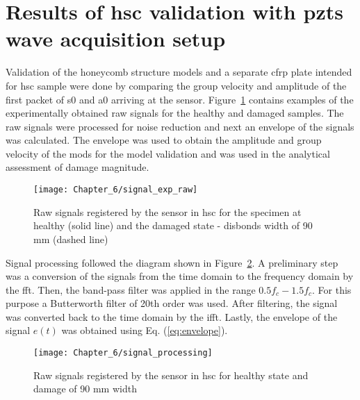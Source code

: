 \section{Results of \acl{hsc} validation with \aclp{pzt} wave acquisition setup}
\label{sec:resuls_pzt}
Validation of the honeycomb structure models and a separate \ac{cfrp} plate intended for \ac{hsc} sample were done by comparing the group velocity and amplitude of the first packet of \ac{s0} and \ac{a0} arriving at the sensor.
Figure~\ref{fig:signal_exp_raw} contains examples of the experimentally obtained raw signals for the healthy and damaged samples.
The raw signals were processed for noise reduction and next an envelope of the signals was calculated.
The envelope was used to obtain the amplitude and group velocity of the mods for the model validation and was used in the analytical assessment of damage magnitude.
\begin{figure}[!htb]
	\begin{center}
		\texttt{[image: Chapter\_6/signal\_exp\_raw]}
	\end{center}
	\caption{Raw signals registered by the sensor in \acl{hsc} for the specimen at healthy (solid line) and the damaged state - disbonds width of 90 \unit{\mm} (dashed line)}
	\label{fig:signal_exp_raw}
\end{figure}
\pagebreak

Signal processing followed the diagram shown in Figure~\ref{fig:signal_processing}.
A preliminary step was a conversion of the signals from the time domain to the frequency domain by the \ac{fft}.
Then, the band-pass filter was applied in the range \(0.5f_c-1.5f_c\).
For this purpose a Butterworth filter of 20th order was used.
After filtering, the signal was converted back to the time domain by the \ac{ifft}.
Lastly, the envelope of the signal \(e(t)\) was obtained using Eq. (\ref{eq:envelope}).

\begin{figure}[!htb]
	\begin{center}
		\texttt{[image: Chapter\_6/signal\_processing]}
	\end{center}
	\caption{Raw signals registered by the sensor in \acl{hsc} for healthy state and damage of 90 \unit{\mm} width}
	\label{fig:signal_processing}
\end{figure}

